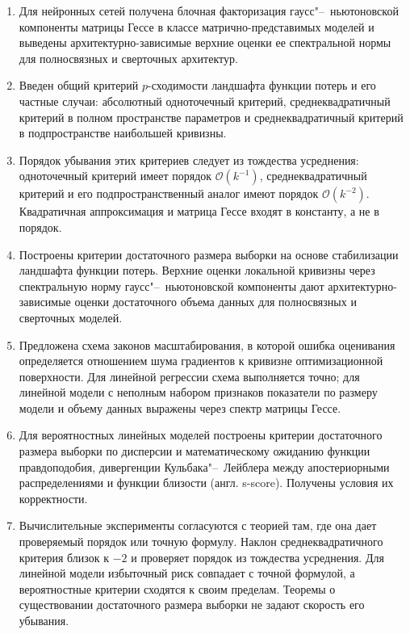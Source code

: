 \begin{enumerate}
    \item Для нейронных сетей получена блочная факторизация гаусс"--~ньютоновской компоненты матрицы Гессе в классе матрично-представимых моделей и выведены архитектурно-зависимые верхние оценки ее спектральной нормы для полносвязных и сверточных архитектур.
    \item Введен общий критерий $p$-сходимости ландшафта функции потерь и его частные случаи: абсолютный одноточечный критерий, среднеквадратичный критерий в полном пространстве параметров и среднеквадратичный критерий в подпространстве наибольшей кривизны.
    \item Порядок убывания этих критериев следует из тождества усреднения: одноточечный критерий имеет порядок $\mathcal{O}(k^{-1})$, среднеквадратичный критерий и его подпространственный аналог имеют порядок $\mathcal{O}(k^{-2})$. Квадратичная аппроксимация и матрица Гессе входят в константу, а не в порядок.
    \item Построены критерии достаточного размера выборки на основе стабилизации ландшафта функции потерь. Верхние оценки локальной кривизны через спектральную норму гаусс"--~ньютоновской компоненты дают архитектурно-зависимые оценки достаточного объема данных для полносвязных и сверточных моделей.
    \item Предложена схема законов масштабирования, в которой ошибка оценивания определяется отношением шума градиентов к кривизне оптимизационной поверхности. Для линейной регрессии схема выполняется точно; для линейной модели с неполным набором признаков показатели по размеру модели и объему данных выражены через спектр матрицы Гессе.
    \item Для вероятностных линейных моделей построены критерии достаточного размера выборки по дисперсии и математическому ожиданию функции правдоподобия, дивергенции Кульбака"--~Лейблера между апостериорными распределениями и функции близости (англ. s-score). Получены условия их корректности.
    \item Вычислительные эксперименты согласуются с теорией там, где она дает проверяемый порядок или точную формулу. Наклон среднеквадратичного критерия близок к $-2$ и проверяет порядок из тождества усреднения. Для линейной модели избыточный риск совпадает с точной формулой, а вероятностные критерии сходятся к своим пределам. Теоремы о существовании достаточного размера выборки не задают скорость его убывания.
\end{enumerate}

